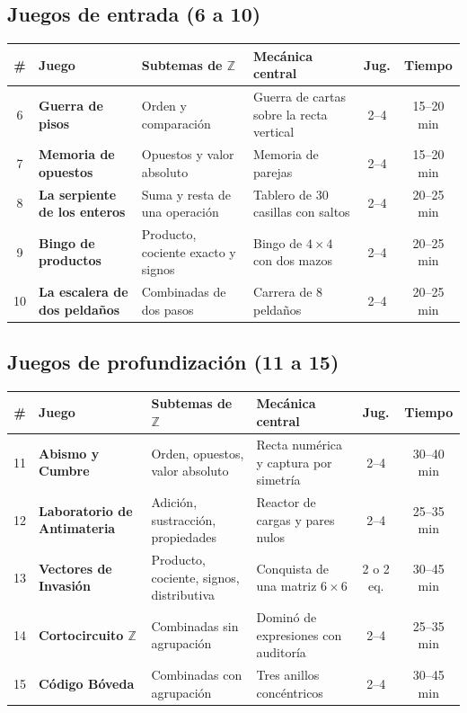 \documentclass[12pt, letterpaper]{article}
\newcommand{\Z}{\mathbb{Z}}
\begin{document}
\subsection*{Juegos de entrada (6 a 10)}

\begin{center}
\footnotesize
\setlength{\tabcolsep}{4pt}
\begin{tabular}{@{}c l p{3.6cm} p{4.6cm} c c@{}}
\toprule
\textbf{\#} & \textbf{Juego} & \textbf{Subtemas de $\Z$} & \textbf{Mecánica central} & \textbf{Jug.} & \textbf{Tiempo}\\
\midrule
6 & \textbf{Guerra de pisos} & Orden y comparación & Guerra de cartas sobre la recta vertical & 2--4 & 15--20 min\\
7 & \textbf{Memoria de opuestos} & Opuestos y valor absoluto & Memoria de parejas & 2--4 & 15--20 min\\
8 & \textbf{La serpiente de los enteros} & Suma y resta de una operación & Tablero de 30 casillas con saltos & 2--4 & 20--25 min\\
9 & \textbf{Bingo de productos} & Producto, cociente exacto y signos & Bingo de $4\times 4$ con dos mazos & 2--4 & 20--25 min\\
10 & \textbf{La escalera de dos peldaños} & Combinadas de dos pasos & Carrera de 8 peldaños & 2--4 & 20--25 min\\
\bottomrule
\end{tabular}
\end{center}

\subsection*{Juegos de profundización (11 a 15)}

\begin{center}
\footnotesize
\setlength{\tabcolsep}{4pt}
\begin{tabular}{@{}c l p{3.6cm} p{4.6cm} c c@{}}
\toprule
\textbf{\#} & \textbf{Juego} & \textbf{Subtemas de $\Z$} & \textbf{Mecánica central} & \textbf{Jug.} & \textbf{Tiempo}\\
\midrule
11 & \textbf{Abismo y Cumbre} & Orden, opuestos, valor absoluto & Recta numérica y captura por simetría & 2--4 & 30--40 min\\
12 & \textbf{Laboratorio de Antimateria} & Adición, sustracción, propiedades & Reactor de cargas y pares nulos & 2--4 & 25--35 min\\
13 & \textbf{Vectores de Invasión} & Producto, cociente, signos, distributiva & Conquista de una matriz $6\times 6$ & 2 o 2 eq. & 30--45 min\\
14 & \textbf{Cortocircuito $\Z$} & Combinadas sin agrupación & Dominó de expresiones con auditoría & 2--4 & 25--35 min\\
15 & \textbf{Código Bóveda} & Combinadas con agrupación & Tres anillos concéntricos & 2--4 & 30--45 min\\
\bottomrule
\end{tabular}
\end{center}
\end{document}
